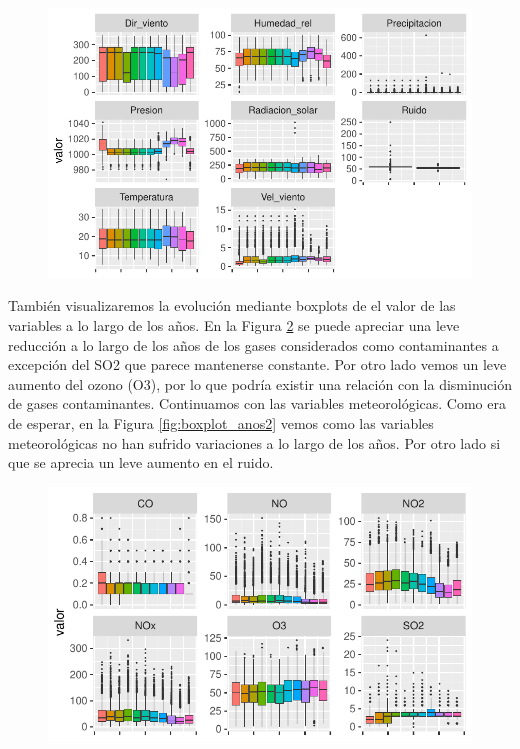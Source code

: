 \documentclass[notspecified,article,submit,moreauthors,pdftex]{Definitions/mdpi}
\begin{document}
\begin{figure}

\includegraphics[width=0.7\linewidth]{ProyectoAED2023_files/figure-latex/boxplot_est2-1} \hfill{}

\caption{\label{fig:boxplot_est2}}\label{fig:boxplot_est2}
\end{figure}

También visualizaremos la evolución mediante boxplots de el valor de las
variables a lo largo de los años. En la Figura \ref{fig:boxplot_anos1}
se puede apreciar una leve reducción a lo largo de los años de los gases
considerados como contaminantes a excepción del SO2 que parece
mantenerse constante. Por otro lado vemos un leve aumento del ozono
(O3), por lo que podría existir una relación con la disminución de gases
contaminantes. Continuamos con las variables meteorológicas. Como era de
esperar, en la Figura \ref{fig:boxplot_anos2} vemos como las variables
meteorológicas no han sufrido variaciones a lo largo de los años. Por
otro lado si que se aprecia un leve aumento en el ruido.

\begin{figure}

\includegraphics[width=0.7\linewidth]{ProyectoAED2023_files/figure-latex/boxplot_anos1-1} \hfill{}

\caption{\label{fig:boxplot_anos1}}\label{fig:boxplot_anos1}
\end{figure}
\end{document}
